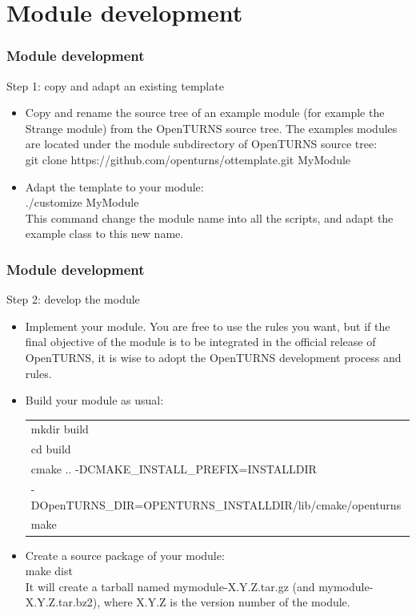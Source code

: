 \documentclass[8pt]{beamer}
\begin{document}
\section[Module development]{Module development}
\begin{frame}
  \frametitle{Module development}
  \begin{block}{Step 1: copy and adapt an existing template}
    \begin{itemize}
    \item Copy and rename the source tree of an example module (for example the Strange module) from the OpenTURNS source tree. The examples modules are located under the module subdirectory of OpenTURNS source tree:\\

      {\ttfamily git clone https://github.com/openturns/ottemplate.git MyModule}
    \item Adapt the template to your module:\\
      {\ttfamily ./customize MyModule}\\
      This command change the module name into all the scripts, and adapt the example class to this new name.
    \end{itemize}
  \end{block}
\end{frame}

\begin{frame}
  \frametitle{Module development}
  \begin{block}{Step 2: develop the module}
    \begin{itemize}
    \item Implement your module. You are free to use the rules you want, but if the final objective of the module is to be integrated in the official release of OpenTURNS, it is wise to adopt the OpenTURNS development process and rules.
    \item Build your module as usual:
      \begin{tabular}{l}
        \ttfamily mkdir build\\
        \ttfamily cd build\\
        \ttfamily cmake .. -DCMAKE\_INSTALL\_PREFIX=INSTALLDIR \\
        \ttfamily -DOpenTURNS\_DIR=OPENTURNS\_INSTALLDIR/lib/cmake/openturns\\
        \ttfamily make
      \end{tabular}
    \item Create a source package of your module:\\
      {\ttfamily make dist}\\
      It will create a tarball named mymodule-X.Y.Z.tar.gz (and mymodule-X.Y.Z.tar.bz2), where X.Y.Z is the version number of the module.
    \end{itemize}
  \end{block}
\end{frame}
\end{document}
